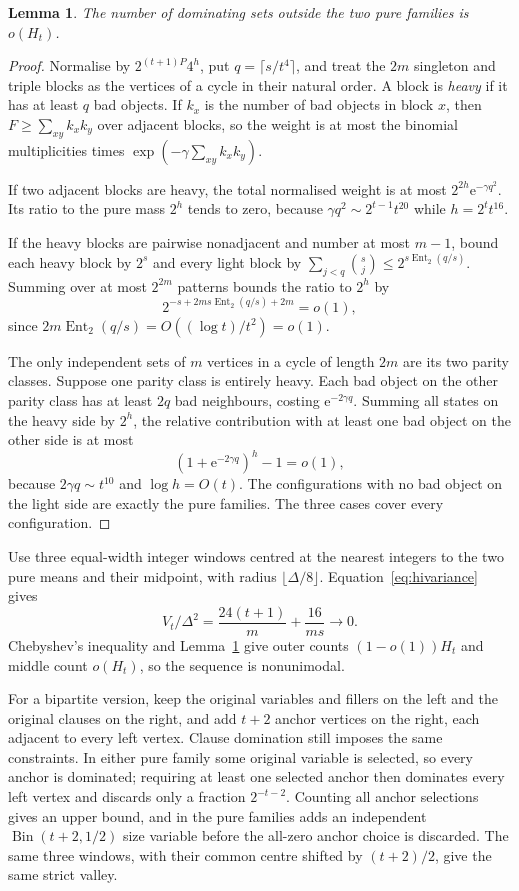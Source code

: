 \documentclass[11pt,a4paper]{article}
\newtheorem{lemma}[theorem]{Lemma}
\theoremstyle{definition}
\theoremstyle{remark}
\newcommand{\Bin}{\operatorname{Bin}}
\newcommand{\Ent}{\operatorname{Ent}}
\begin{document}
\begin{lemma}\label{lem:hiphase}
The number of dominating sets outside the two pure families is $o(H_t)$.
\end{lemma}
\begin{proof}
Normalise by $2^{(t+1)P}4^h$, put $q=\lceil s/t^4\rceil$, and treat the $2m$ singleton and triple blocks as the vertices of a cycle in their natural order. A block is \emph{heavy} if it has at least $q$ bad objects. If $k_x$ is the number of bad objects in block $x$, then $F\ge\sum_{xy}k_xk_y$ over adjacent blocks, so the weight is at most the binomial multiplicities times
$\exp(-\gamma\sum_{xy}k_xk_y)$.

If two adjacent blocks are heavy, the total normalised weight is at most $2^{2h}\mathrm e^{-\gamma q^2}$. Its ratio to the pure mass $2^h$ tends to zero, because $\gamma q^2\sim2^{t-1}t^{20}$ while $h=2^t t^{16}$.

If the heavy blocks are pairwise nonadjacent and number at most $m-1$, bound each heavy block by $2^s$ and every light block by
$\sum_{j<q}\binom{s}{j}\le2^{s\Ent_2(q/s)}$.
Summing over at most $2^{2m}$ patterns bounds the ratio to $2^h$ by
\[
2^{-s+2ms\Ent_2(q/s)+2m}=o(1),
\]
since $2m\Ent_2(q/s)=O((\log t)/t^2)=o(1)$.

The only independent sets of $m$ vertices in a cycle of length $2m$ are its two parity classes. Suppose one parity class is entirely heavy. Each bad object on the other parity class has at least $2q$ bad neighbours, costing $\mathrm e^{-2\gamma q}$. Summing all states on the heavy side by $2^h$, the relative contribution with at least one bad object on the other side is at most
\[
(1+\mathrm e^{-2\gamma q})^h-1=o(1),
\]
because $2\gamma q\sim t^{10}$ and $\log h=O(t)$. The configurations with no bad object on the light side are exactly the pure families. The three cases cover every configuration.
\end{proof}

Use three equal-width integer windows centred at the nearest integers to the two pure means and their midpoint, with radius $\lfloor\Delta/8\rfloor$. Equation~\eqref{eq:hivariance} gives
\[
V_t/\Delta^2=\frac{24(t+1)}m+\frac{16}{ms}\longrightarrow0 .
\]
Chebyshev's inequality and Lemma~\ref{lem:hiphase} give outer counts $(1-o(1))H_t$ and middle count $o(H_t)$, so the sequence is nonunimodal.

For a bipartite version, keep the original variables and fillers on the left and the original clauses on the right, and add $t+2$ anchor vertices on the right, each adjacent to every left vertex. Clause domination still imposes the same constraints. In either pure family some original variable is selected, so every anchor is dominated; requiring at least one selected anchor then dominates every left vertex and discards only a fraction $2^{-t-2}$. Counting all anchor selections gives an upper bound, and in the pure families adds an independent $\Bin(t+2,1/2)$ size variable before the all-zero anchor choice is discarded. The same three windows, with their common centre shifted by $(t+2)/2$, give the same strict valley.
\end{document}
